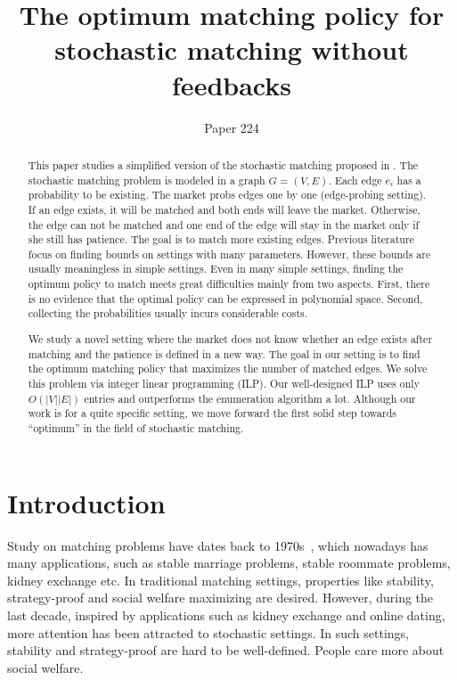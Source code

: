 \documentclass[letterpaper]{article}
\title {The optimum matching policy for stochastic matching without feedbacks}
\author {Paper 224}
\begin{document}
%

\maketitle
\begin{abstract}
This paper studies a simplified version of the stochastic matching proposed in \cite{chen2009approximating}.
The stochastic matching problem is modeled in a graph $G=(V,E)$. 
Each edge $e_i$ has a probability to be existing. 
The market probs edges one by one (edge-probing setting).
If an edge exists, it will be matched and both ends will leave the market.
Otherwise, the edge can not be matched and one end of the edge will stay in the market only if she still has patience.
The goal is to match more existing edges.
Previous literature focus on finding bounds on settings with many parameters.
However, these bounds are usually meaningless in simple settings.
Even in many simple settings, finding the optimum policy to match meets great difficulties mainly from two aspects.
First, there is no evidence that the optimal policy can be expressed in polynomial space.
Second, collecting the probabilities usually incurs considerable costs.

We study a novel setting where the market does not know whether an edge exists after matching and the patience is defined in a new way.
The goal in our setting is to find the optimum matching policy that maximizes the number of matched edges.
We solve this problem via integer linear programming (ILP).
Our well-designed ILP uses only $O(|V||E|)$ entries and outperforms the enumeration algorithm a lot.
Although our work is for a quite specific setting, we move forward the first solid step towards ``optimum'' in the field of stochastic matching.

\end{abstract}

\section{Introduction}

Study on matching problems have dates back to 1970s~\cite{keylist}, which nowadays has many applications, such as stable marriage problems, stable roommate problems, kidney exchange etc.
In traditional matching settings, properties like stability, strategy-proof and social welfare maximizing are desired.
However, during the last decade, inspired by applications such as kidney exchange and online dating, more attention has been attracted to stochastic settings.
In such settings, stability and strategy-proof are hard to be well-defined.
People care more about social welfare.
\end{document}
